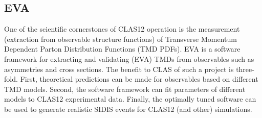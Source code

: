 \subsection{EVA}
One of the scientific cornerstones of CLAS12 operation is the measurement (extraction from observable structure functions) of Transverse Momentum Dependent Parton Distribution Functions (TMD PDFs).  EVA is a software framework for extracting and validating (EVA) TMDs from observables such as asymmetries and cross sections.  The benefit to CLAS of such a project is three-fold.  First, theoretical predictions can be made for observables based on different TMD models.  Second, the software framework can fit parameters of different models to CLAS12 experimental data.  Finally, the optimally tuned software can be used to generate realistic SIDIS events for CLAS12 (and other) simulations.  \\

